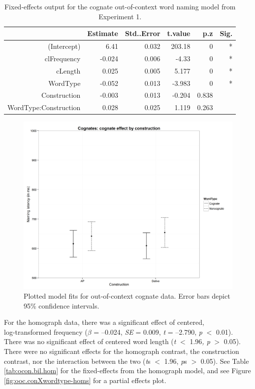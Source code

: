 \begin{table}[htbp]
  \centering
  \caption{Fixed-effects output for the cognate out-of-context word naming model from Experiment 1.}
    \begin{tabular}{rrrrrr}
    \toprule
          & Estimate & Std..Error & t.value & p.z   & Sig. \\
    \midrule
    (Intercept) & 6.41  & 0.032 & 203.18 & 0     & * \\
    clFrequency & -0.024 & 0.006 & -4.33 & 0     & * \\
    cLength & 0.025 & 0.005 & 5.177 & 0     & * \\
    WordType & -0.052 & 0.013 & -3.983 & 0     & * \\
    Construction & -0.003 & 0.013 & -0.204 & 0.838 &  \\
    WordType:Construction & 0.028 & 0.025 & 1.119 & 0.263 &  \\
    \bottomrule
    \end{tabular}%
  \label{tab:ocon.bil.cog}%
\end{table}%


\begin{figure}[htbp]
\centering
\includegraphics[width=\textwidth,height=\textheight,keepaspectratio]{conXwordtype-cogs.png}
\caption{Plotted model fits for out-of-context cognate data. Error bars depict 95\% confidence intervals.}
\label{fig:ooc.conXwordtype-cogs}
\end{figure}


For the homograph data, there was a significant effect of centered,\\ log-transformed frequency (\emph{$\beta$} = --0.024, \emph{SE} = 0.009, \emph{t} = --2.790, \emph{p} $<$ 0.01). There was no significant effect of centered word length (\emph{t} $<$ 1.96\emph{, p} $>$ 0.05). There were no significant effects for the homograph contrast, the construction contrast, nor the interaction between the two (\emph{t}s $<$ 1.96, \emph{p}s $>$ 0.05). See Table \ref{tab:ocon.bil.hom} for the fixed-effects from the homograph model, and see Figure \ref{fig:ooc.conXwordtype-homs} for a partial effects plot.

